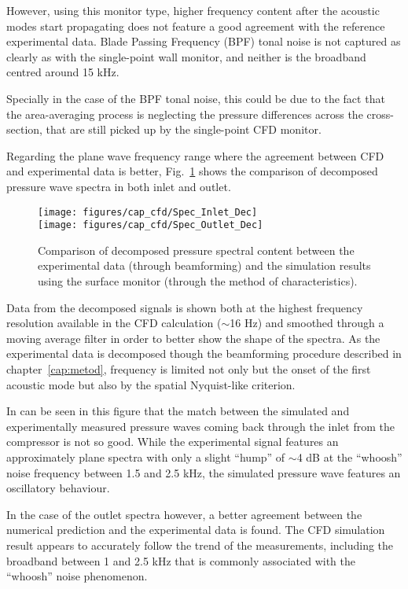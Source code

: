 However, using this monitor type, higher frequency content after the acoustic modes start propagating does not feature a good agreement with the reference experimental data. Blade Passing Frequency (BPF) tonal noise is not captured as clearly as with the single-point wall monitor, and neither is the broadband centred around 15 kHz. 

Specially in the case of the BPF tonal noise, this could be due to the fact that the area-averaging process is neglecting the pressure differences across the cross-section, that are still picked up by the single-point CFD monitor.

Regarding the plane wave frequency range where the agreement between CFD and experimental data is better, Fig.~\ref{fig:cfd_Spec_PlaneW_Dec} shows the comparison of decomposed pressure wave spectra in both inlet and outlet. 

\begin{figure}[htb!]
\centering
\texttt{[image: figures/cap\_cfd/Spec\_Inlet\_Dec]}\\[5mm]
\texttt{[image: figures/cap\_cfd/Spec\_Outlet\_Dec]}
\caption{Comparison of decomposed pressure spectral content between the experimental data (through beamforming) and the simulation results using the surface monitor (through the method of characteristics).}
\label{fig:cfd_Spec_PlaneW_Dec}
\end{figure}

Data from the decomposed signals is shown both at the highest frequency resolution available in the CFD calculation ($\sim$16 Hz) and smoothed through a moving average filter in order to better show the shape of the spectra. As the experimental data is decomposed though the beamforming procedure described in chapter~\ref{cap:metod}, frequency is limited not only but the onset of the first acoustic mode but also by the spatial Nyquist-like criterion.

In can be seen in this figure that the match between the simulated and experimentally measured pressure waves coming back through the inlet from the compressor is not so good. While the experimental signal features an approximately plane spectra with only a slight ``hump'' of $\sim$4 dB at the ``whoosh'' noise frequency between 1.5 and 2.5 kHz, the simulated pressure wave features an oscillatory behaviour.

In the case of the outlet spectra however, a better agreement between the numerical prediction and the experimental data is found. The CFD simulation result appears to accurately follow the trend of the measurements, including the broadband between 1 and 2.5 kHz that is commonly associated with the ``whoosh'' noise phenomenon.

